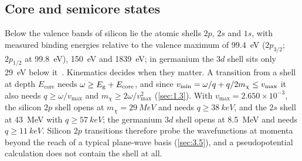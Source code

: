 \subsection{Core and semicore states}

Below the valence bands of silicon lie the atomic shells $2p$, $2s$ and $1s$, with measured binding energies relative to the valence maximum of \SI{99.4}{eV} ($2p_{3/2}$; $2p_{1/2}$ at \SI{99.8}{eV}), \SI{150}{eV} and \SI{1839}{eV}; in germanium the $3d$ shell sits only \SI{29}{eV} below it~\cite[Table~1-1]{williams2009electron}. Kinematics decides when they matter. A transition from a shell at depth $E_{\mathrm{core}}$ needs $\omega \ge E_{\mathrm{g}} + E_{\mathrm{core}}$, and since $v_{\mathrm{min}} = \omega/q + q/2m_\chi \le v_{\mathrm{max}}$ it also needs $q \ge \omega/v_{\mathrm{max}}$ and $m_\chi \ge 2\omega/v_{\mathrm{max}}^2$ (\cref{sec:1.3}). With $v_{\mathrm{max}} = 2.650\times10^{-3}$, the silicon $2p$ shell opens at $m_\chi = \SI{29}{MeV}$ and needs $q \ge \SI{38}{keV}$, and the $2s$ shell at \SI{43}{MeV} with $q \ge \SI{57}{keV}$; the germanium $3d$ shell opens at \SI{8.5}{MeV} and needs $q \ge \SI{11}{keV}$. Silicon $2p$ transitions therefore probe the wavefunctions at momenta beyond the reach of a typical plane-wave basis (\cref{sec:3.5}), and a pseudopotential calculation does not contain the shell at all.

